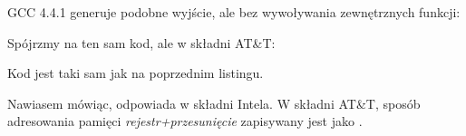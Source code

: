 
GCC 4.4.1 generuje podobne wyjście, ale bez wywoływania zewnętrznych funkcji:




Spójrzmy na ten sam kod, ale w składni AT\&T:



\myindex{\ATTSyntax}
Kod jest taki sam jak na poprzednim listingu.

Nawiasem mówiąc,  odpowiada  w składni Intela.
W składni AT\&T, sposób adresowania pamięci \emph{rejestr+przesunięcie} zapisywany jest jako .


